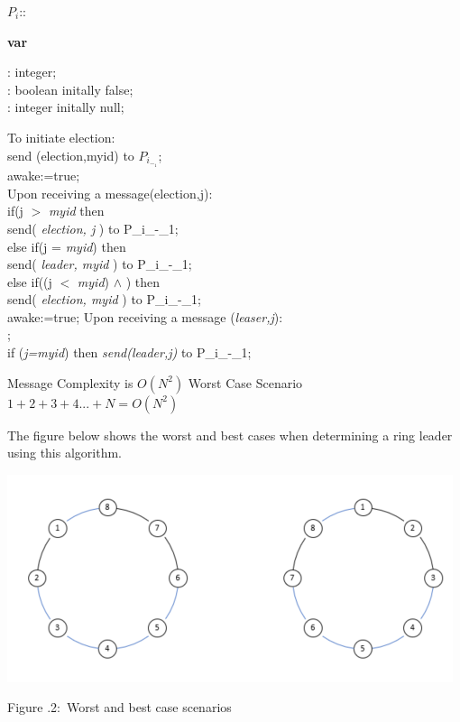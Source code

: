 \documentclass[twoside]{article}
\newcounter{lecnum}
\newcommand{\fig}[3]{
			\vspace{#2}
			\begin{center}
			Figure \thelecnum.#1:~#3
			\end{center}
	}
\begin{document}
\begin{algorithm}[H]
 $P_i$::
 
\textbf{var}

: integer;\\
: boolean initally false;\\
: integer initally null;\\
\break


To initiate election:\\
\quad send (election,myid) to $P_i_-_1$;\\
\quad awake:=true;\\
\break
Upon receiving a message(election,j):\\
\quad if(j $>$ {\it myid} then\\
\quad\quad send( {\it election, j} ) to P_i_-_1;\\
\quad else if(j = {\it myid}) then\\
\quad\quad send( {\it leader, myid} ) to P_i_-_1;\\
\quad else if((j $<$ {\it myid}) $\wedge$ ) then\\
\quad\quad send( {\it election, myid} ) to P_i_-_1;\\
\quad awake:=true;
\newline
Upon receiving a message ({\it leaser,j}):\\
;\\
\quad if ({\it j=myid}) then {\it send(leader,j)} to P_i_-_1;\\
	
\end{algorithm}

Message Complexity is 
$O(N^2)$
Worst Case Scenario 
$1+2+3+4 ... + N = O(N^2)$

The figure below shows the worst and best cases when determining a ring leader using this algorithm.

\begin{center}
\includegraphics{Ring_diagram_worst_best_case.png}
\fig{2}{0in}{Worst and best case scenarios}
\end{center}
\end{document}
